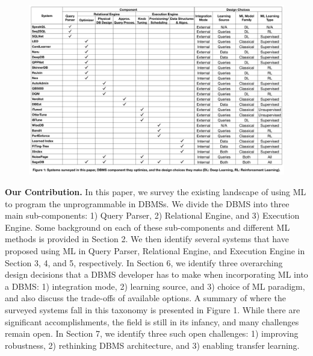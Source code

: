 \begin{figure}
    \centering
    \vspace{-6mm}
    \includegraphics[height=0.85\textwidth, angle=90]{images/taxonomy.pdf}
\end{figure}

\vspace{2mm}
\noindent \textbf{Our Contribution.} In this paper, we survey the existing landscape of using ML to program the unprogrammable in DBMSs. 
We divide the DBMS into three main sub-components: 1) Query Parser, 2) Relational Engine, and 3) Execution Engine. Some background on each of these sub-components and different ML methods is provided in Section 2.
We then identify several systems that have proposed using ML in Query Parser, Relational Engine, and Execution Engine in Section 3, 4, and 5, respectively.
In Section 6, we identify three overarching design decisions that a DBMS developer has to make when incorporating ML into a DBMS: 1) integration mode, 2) learning source, and 3) choice of ML paradigm, and also discuss the trade-offs of available options.
A summary of where the surveyed systems fall in this taxonomy is presented in Figure 1.
While there are significant accomplishments, the field is still in its infancy, and many challenges remain open.
In Section 7, we identify three such open challenges: 1) improving robustness, 2) rethinking DBMS architecture, and 3) enabling transfer learning.
